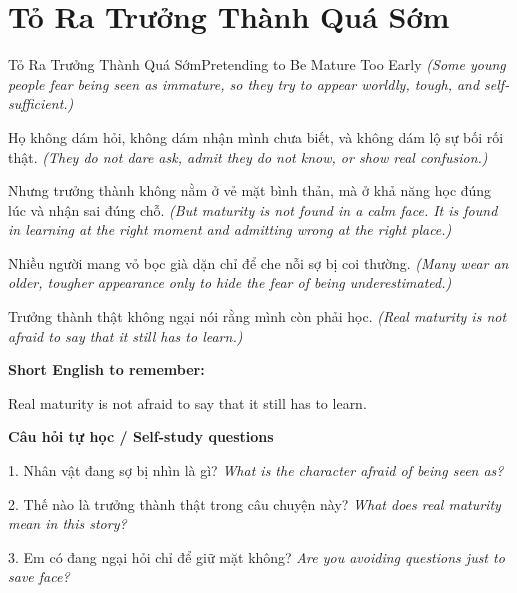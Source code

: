 \section{Tỏ Ra Trưởng Thành Quá Sớm}
\begin{truyen}{Tỏ Ra Trưởng Thành Quá Sớm}{Pretending to Be Mature Too Early}
\textit{(Some young people fear being seen as immature, so they try to appear worldly, tough, and self-sufficient.)}

Họ không dám hỏi, không dám nhận mình chưa biết, và không dám lộ sự bối rối thật.
\textit{(They do not dare ask, admit they do not know, or show real confusion.)}

Nhưng trưởng thành không nằm ở vẻ mặt bình thản, mà ở khả năng học đúng lúc và nhận sai đúng chỗ.
\textit{(But maturity is not found in a calm face. It is found in learning at the right moment and admitting wrong at the right place.)}

Nhiều người mang vỏ bọc già dặn chỉ để che nỗi sợ bị coi thường.
\textit{(Many wear an older, tougher appearance only to hide the fear of being underestimated.)}

\end{truyen}

\begin{baihoc}
Trưởng thành thật không ngại nói rằng mình còn phải học.
\textit{(Real maturity is not afraid to say that it still has to learn.)}
\end{baihoc}

\begin{ghinhoanh}
\textbf{Short English to remember:}

Real maturity is not afraid to say that it still has to learn.

\end{ghinhoanh}

\begin{tuhocnhanh}
\textbf{Câu hỏi tự học / Self-study questions}

1. Nhân vật đang sợ bị nhìn là gì? \textit{What is the character afraid of being seen as?}

2. Thế nào là trưởng thành thật trong câu chuyện này? \textit{What does real maturity mean in this story?}

3. Em có đang ngại hỏi chỉ để giữ mặt không? \textit{Are you avoiding questions just to save face?}
\end{tuhocnhanh}
\ngancach

